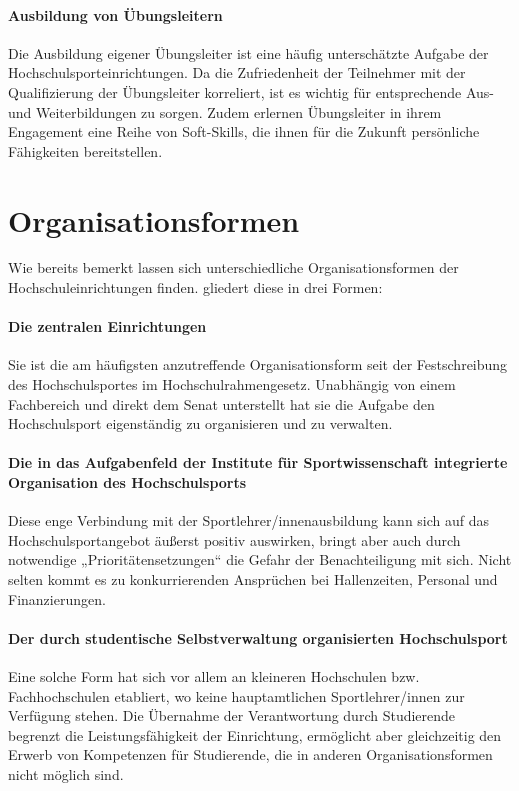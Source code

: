 \paragraph*{Ausbildung von Übungsleitern}
Die Ausbildung eigener Übungsleiter ist eine häufig unterschätzte Aufgabe der Hochschulsporteinrichtungen. Da die Zufriedenheit der Teilnehmer mit der Qualifizierung der Übungsleiter korreliert, ist es wichtig für entsprechende Aus- und Weiterbildungen zu sorgen. Zudem erlernen Übungsleiter in ihrem Engagement eine Reihe von Soft-Skills, die ihnen für die Zukunft persönliche Fähigkeiten bereitstellen.

\section{Organisationsformen}
Wie bereits bemerkt lassen sich unterschiedliche Organisationsformen der Hochschuleinrichtungen finden. \citet*[S. 15]{Radde.1996} gliedert diese in drei Formen:
\paragraph*{Die zentralen Einrichtungen}
Sie ist die am häufigsten anzutreffende Organisationsform seit der Festschreibung des Hochschulsportes im Hochschulrahmengesetz. Unabhängig von einem Fachbereich und direkt dem Senat unterstellt hat sie die Aufgabe den Hochschulsport eigenständig zu organisieren und zu verwalten.

\paragraph*{Die in das Aufgabenfeld der Institute für Sportwissenschaft integrierte Organisation des Hochschulsports}
Diese enge Verbindung mit der Sportlehrer/innenausbildung kann sich auf das Hochschulsportangebot äußerst positiv auswirken, bringt aber auch durch notwendige „Prioritätensetzungen“ die Gefahr der Benachteiligung mit sich. Nicht selten kommt es zu konkurrierenden Ansprüchen bei Hallenzeiten, Personal und Finanzierungen.

\paragraph*{Der durch studentische Selbstverwaltung organisierten Hochschulsport}
Eine solche Form hat sich vor allem an kleineren Hochschulen bzw. Fachhochschulen etabliert, wo keine hauptamtlichen Sportlehrer/innen zur Verfügung stehen. Die Übernahme der Verantwortung durch Studierende begrenzt die Leistungsfähigkeit der Einrichtung, ermöglicht aber gleichzeitig den Erwerb von Kompetenzen für Studierende, die in anderen Organisationsformen nicht möglich sind. 

